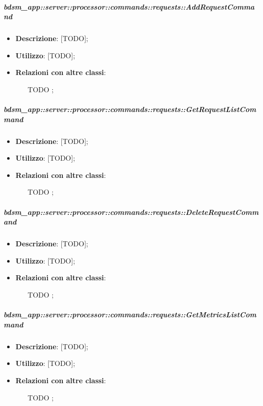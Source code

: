         \subparagraph{bdsm\_app::server::processor::commands::requests::AddRequestCommand} %
        \label{subp:bdsm_app_server_processor_commands_requests_addrequestcommand}
        \begin{itemize}
          \item \textbf{Descrizione}: [TODO];
          \item \textbf{Utilizzo}: [TODO];
          \item \textbf{Relazioni con altre classi}:
            \begin{itemize}
              \item [TODO];
            \end{itemize}
        \end{itemize}

        \subparagraph{bdsm\_app::server::processor::commands::requests::GetRequestListCommand} %
        \label{subp:bdsm_app_server_processor_commands_requests_getrequestlistcommand}
        \begin{itemize}
          \item \textbf{Descrizione}: [TODO];
          \item \textbf{Utilizzo}: [TODO];
          \item \textbf{Relazioni con altre classi}:
            \begin{itemize}
              \item [TODO];
            \end{itemize}
        \end{itemize}

        \subparagraph{bdsm\_app::server::processor::commands::requests::DeleteRequestCommand} %
        \label{subp:bdsm_app_server_processor_commands_requests_deleterequestcommand}
        \begin{itemize}
          \item \textbf{Descrizione}: [TODO];
          \item \textbf{Utilizzo}: [TODO];
          \item \textbf{Relazioni con altre classi}:
            \begin{itemize}
              \item [TODO];
            \end{itemize}
        \end{itemize}

        \subparagraph{bdsm\_app::server::processor::commands::requests::GetMetricsListCommand} %
        \label{subp:bdsm_app_server_processor_commands_requests_getmetricslistcommand}
        \begin{itemize}
          \item \textbf{Descrizione}: [TODO];
          \item \textbf{Utilizzo}: [TODO];
          \item \textbf{Relazioni con altre classi}:
            \begin{itemize}
              \item [TODO];
            \end{itemize}
        \end{itemize}

